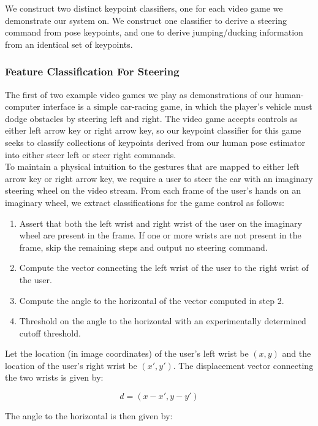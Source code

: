 \documentclass[10pt,twocolumn,letterpaper]{article}
\begin{document}
We construct two distinct keypoint classifiers, one for each video game we 
demonstrate our system on. We construct one classifier to derive a steering 
command from pose keypoints, and one to derive jumping/ducking information 
from an identical set of keypoints.

\subsubsection{Feature Classification For Steering}
The first of two example video games we play as demonstrations of our 
human-computer interface is a simple car-racing game, in which the player's 
vehicle must dodge obstacles by steering left and right. The video game 
accepts controls as either left arrow key or right arrow key, so our 
keypoint classifier for this game seeks to classify collections of keypoints 
derived from our human pose estimator into either steer left or steer right 
commands.\\

To maintain a physical intuition to the gestures that are mapped to either 
left arrow key or right arrow key, we require a user to steer the car with 
an imaginary steering wheel on the video stream. From each frame of the user's 
hands on an imaginary wheel, we extract classifications for the game control 
as follows:

\begin{enumerate}
    \item Assert that both the left wrist and right wrist of the user on the 
        imaginary wheel are present in the frame. If one or more wrists are 
        not present in the frame, skip the remaining steps and output no 
        steering command.
    \item Compute the vector connecting the left wrist of the user to the 
        right wrist of the user.
    \item Compute the angle to the horizontal of the vector computed in step 2.
    \item Threshold on the angle to the horizontal with an experimentally 
        determined cutoff threshold.
\end{enumerate}

Let the location (in image coordinates) of the user's left wrist be $(x,y)$ and 
the location of the user's right wrist be $(x', y')$. The displacement vector 
connecting the two wrists is given by:

$$d = (x - x', y - y')$$

The angle to the horizontal is then given by:
\end{document}
